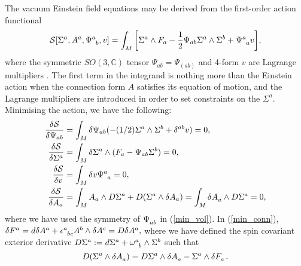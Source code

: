 \documentclass[a4paper,12pt, onecolumn, notitlepage]{article}
\theoremstyle{definition}
\theoremstyle{remark}
\newcommand{\w}{\omega}
\newcommand{\e}{\epsilon}
\begin{document}
The vacuum Einstein field equations may be derived from the first-order action functional
\begin{equation}
\label{action}
\mathcal{S}[\Sigma^{a}, A^{a}, \Psi\indices{^a_b}, v] = \int_{M}\bigg[\Sigma^{a}\wedge F_{a} - \frac{1}{2}\Psi_{ab}\Sigma^{a}\wedge\Sigma^{b} + \Psi\indices{^a_a}v\bigg],
\end{equation}
where the symmetric $SO(3,\mathbb{C})$ tensor $\Psi_{ab}=\Psi_{(ab)}$ and 4-form $v$ are Lagrange multipliers \cite{capovilla_1989}. The first term in the integrand is nothing more than the Einstein action when the connection form $A$ satisfies its equation of motion, and the Lagrange multipliers are introduced in order to set constraints on the $\Sigma^{a}$. Minimising the action, we have the following:
\begin{subequations}
\begin{align}
	\label{min_sym}
	\frac{\delta\mathcal{S}}{\delta\Psi_{ab}} &= \int_{M}\delta\Psi_{ab}(- (1/2)\Sigma^{a}\wedge\Sigma^{b} + \delta^{ab}v) = 0,\\
	\label{min_form}
	\frac{\delta\mathcal{S}}{\delta\Sigma^{a}} &= \int_{M}\delta\Sigma^{a}\wedge(F_{a} - \Psi_{ab}\Sigma^{b}) = 0,\\
	\label{min_vol}
	\frac{\delta\mathcal{S}}{\delta v} &= \int_{M}\delta v\Psi\indices{^a_a} = 0,\\
	\label{min_conn}
	\frac{\delta\mathcal{S}}{\delta A_{a}} &= \int_{M}A_{a}\wedge D\Sigma^{a} + D(\Sigma^{a}\wedge\delta A_{a}) = \int_{M}\delta A\indices{_a}\wedge D\Sigma\indices{^a} = 0,
	\end{align}
\end{subequations}
where we have used the symmetry of $\Psi\indices{_a_b}$ in (\ref{min_vol}). In (\ref{min_conn}), $\delta F\indices{^a}=d\delta A\indices{^a}+\e\indices{^a_b_c}A\indices{^b}\wedge \delta A\indices{^c} = D\delta A\indices{^a},$ where we have defined the spin covariant exterior derivative $D\Sigma\indices{^a} := d\Sigma\indices{^a}+ \w\indices{^a_b}\wedge\Sigma\indices{^b}$ such that
\begin{equation*}
	D(\Sigma\indices{^a}\wedge\delta A\indices{_a})=D\Sigma\indices{^a}\wedge\delta A\indices{_a} - \Sigma\indices{^a}\wedge \delta F\indices{_a}.
\end{equation*}
\end{document}
